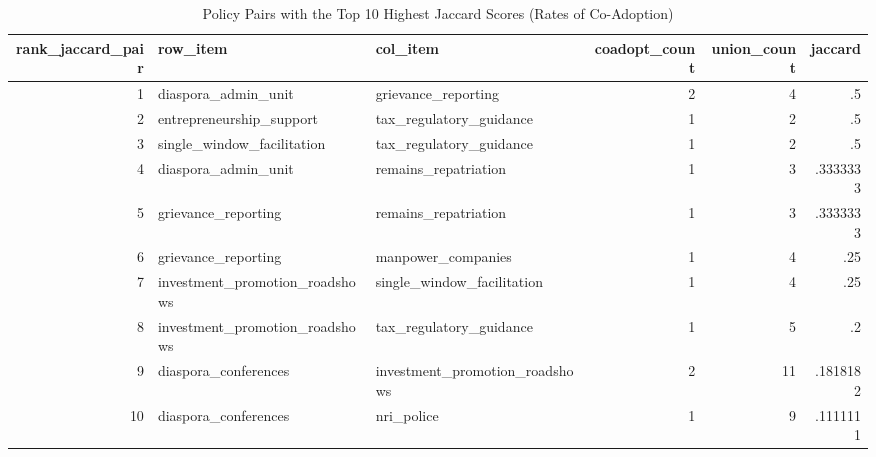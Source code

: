 \begin{table}[htbp]
\centering
\footnotesize
\setlength{\tabcolsep}{3pt}
\renewcommand{\arraystretch}{1.08}
\caption{Policy Pairs with the Top 10 Highest Jaccard Scores (Rates of Co-Adoption)}
\label{tab:jaccard_top10}
{\small
\begin{tabular}{r p{2.7cm} p{2.7cm} r r r}
\hline
rank\_jaccard\_pair & row\_item & col\_item & coadopt\_count & union\_count & jaccard \\
\hline
1 & diaspora\_admin\_unit & grievance\_reporting & 2 & 4 & .5 \\
2 & entrepreneurship\_support & tax\_regulatory\_guidance & 1 & 2 & .5 \\
3 & single\_window\_facilitation & tax\_regulatory\_guidance & 1 & 2 & .5 \\
4 & diaspora\_admin\_unit & remains\_repatriation & 1 & 3 & .3333333 \\
5 & grievance\_reporting & remains\_repatriation & 1 & 3 & .3333333 \\
6 & grievance\_reporting & manpower\_companies & 1 & 4 & .25 \\
7 & investment\_promotion\_roadshows & single\_window\_facilitation & 1 & 4 & .25 \\
8 & investment\_promotion\_roadshows & tax\_regulatory\_guidance & 1 & 5 & .2 \\
9 & diaspora\_conferences & investment\_promotion\_roadshows & 2 & 11 & .1818182 \\
10 & diaspora\_conferences & nri\_police & 1 & 9 & .1111111 \\
\hline
\end{tabular}
}
\end{table}
